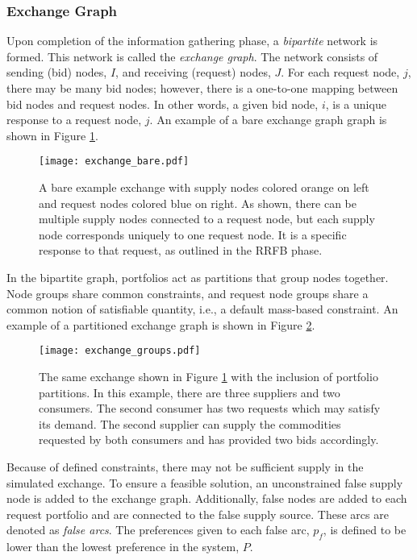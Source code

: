 \subsubsection{Exchange Graph}

Upon completion of the information gathering phase, a \textit{bipartite} network
is formed. This network is called the \textit{exchange graph}. The network
consists of sending (bid) nodes, $I$, and receiving (request) nodes, $J$. For
each request node, $j$, there may be many bid nodes; however, there is a
one-to-one mapping between bid nodes and request nodes. In other words, a given
bid node, $i$, is a unique response to a request node, $j$. An example of a bare
exchange graph graph is shown in Figure \ref{fig:ex_bare}.

\begin{figure}
  \begin{center}
    \texttt{[image: exchange\_bare.pdf]}
    \caption{A bare example exchange with supply nodes colored orange on left
      and request nodes colored blue on right. As shown, there can be multiple
      supply nodes connected to a request node, but each supply node corresponds
      uniquely to one request node. It is a specific response to that request,
      as outlined in the RRFB phase.}
    \label{fig:ex_bare}
  \end{center}
\end{figure}

In the bipartite graph, portfolios act as partitions that group nodes
together. Node groups share common constraints, and request node groups share a
common notion of satisfiable quantity, i.e., a default mass-based constraint. An
example of a partitioned exchange graph is shown in Figure \ref{fig:ex_groups}.

\begin{figure}
  \begin{center}
    \texttt{[image: exchange\_groups.pdf]}
    \caption{The same exchange shown in Figure \ref{fig:ex_bare} with the
      inclusion of portfolio partitions. In this example, there are three
      suppliers and two consumers. The second consumer has two requests which
      may satisfy its demand. The second supplier can supply the commodities
      requested by both consumers and has provided two bids accordingly.}
    \label{fig:ex_groups}
  \end{center}
\end{figure}

Because of defined constraints, there may not be sufficient supply in the
simulated exchange. To ensure a feasible solution, an unconstrained false supply
node is added to the exchange graph. Additionally, false nodes are added to each
request portfolio and are connected to the false supply source. These arcs are
denoted as \textit{false arcs}. The preferences given to each false arc, $p_f$,
is defined to be lower than the lowest preference in the system, $P$.

